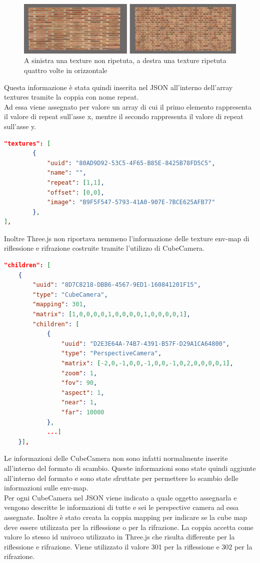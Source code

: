 \begin{figure}[htb]
 \centering
 \includegraphics[width=1\linewidth]{images/chapter_architettura_sistema/repeat.png}\hfill
 \caption[Esempio di ripetizione delle texture]{A sinistra una texture non ripetuta, a destra una texture ripetuta quattro volte in orizzontale}
 \label{fig:architettura_sistema_repeat}
\end{figure}
Questa informazione è stata quindi inserita nel JSON all’interno dell’array textures tramite la coppia con nome repeat. 
\\
Ad essa viene assegnato per valore un array di cui il primo elemento rappresenta il valore di repeat sull’asse x, mentre il secondo rappresenta il valore di repeat sull’asse y.
\begin{lstlisting}[language=json]
"textures": [
        {
            "uuid": "80AD9D92-53C5-4F65-B85E-8425B78FD5C5",
            "name": "",
            "repeat": [1,1],
            "offset": [0,0],
            "image": "B9F5F547-5793-41A0-907E-7BCE625AFB77"
        },
],
\end{lstlisting}
Inoltre Three.js non riportava nemmeno l’informazione delle texture env-map di riflessione e rifrazione costruite tramite l’utilizzo di CubeCamera.
\begin{lstlisting}[language=json]
"children": [
    {
        "uuid": "8D7C8218-DBB6-4567-9ED1-160841201F15",
        "type": "CubeCamera",
        "mapping": 301,
        "matrix": [1,0,0,0,0,1,0,0,0,0,1,0,0,0,0,1],
        "children": [
            {
                "uuid": "D2E3E64A-74B7-4391-B57F-D29A1CA64800",
                "type": "PerspectiveCamera",
                "matrix": [-2,0,-1,0,0,-1,0,0,-1,0,2,0,0,0,0,1],
                "zoom": 1,
                "fov": 90,
                "aspect": 1,
                "near": 1,
                "far": 10000
            },
            ...]
    }],
\end{lstlisting}
Le informazioni delle CubeCamera non sono infatti normalmente inserite all’interno del formato di scambio. 
Queste informazioni sono state quindi aggiunte all’interno del formato e sono state sfruttate per permettere lo scambio delle informazioni sulle env-map.
\\
Per ogni CubeCamera nel JSON viene indicato a quale oggetto assegnarla e vengono descritte le informazioni di tutte e sei le perspective camera ad essa assegnate. 
Inoltre è stato creata la coppia mapping per indicare se la cube map deve essere utilizzata per la riflessione o per la rifrazione. La coppia accetta come valore lo stesso id univoco utilizzato in Three.js che risulta differente per la riflessione e rifrazione. Viene utilizzato il valore 301 per la riflessione e 302 per la rifrazione.
\\

